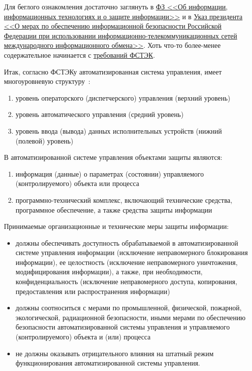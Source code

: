 Для беглого ознакомления достаточно заглянуть в
\href{http://www.consultant.ru/document/cons_doc_LAW_61798/0e9ec16b786dcbdaaa7f44abfc4a15e601d5be22/#dst100144}{ФЗ <<Об информации, информационных технологиях и о защите информации>>} и в \href{http://www.consultant.ru/document/cons_doc_LAW_75586/#dst0}{Указ президента <<О мерах по обеспечению информационной безопасности Российской Федерации при использовании информационно-телекоммуникационных сетей международного информационного обмена>>}. Хоть что-то более-менее содержательное начинается с \href{https://fstec.ru/en/288-tekhnicheskaya-zashchita-informatsii/obespechenie-bezopasnosti-kriticheskoj-informatsionnoj-infrastruktury/prikazy/1702-prikaz-fstek-rossii-ot-14-marta-2014-g-n-32}{требований ФСТЭК}.

Итак, согласно ФСТЭКу автоматизированная система управления, имеет многоуровневую структуру~\label{pon:bez}:
\begin{enumerate}
	\item уровень операторского (диспетчерского) управления (верхний уровень)
	\item уровень автоматического управления (средний уровень)
	\item уровень ввода (вывода) данных исполнительных устройств (нижний (полевой) уровень)
\end{enumerate}

В автоматизированной системе управления объектами защиты являются:
\begin{enumerate}
	\item информация (данные) о параметрах (состоянии) управляемого (контролируемого) объекта или процесса
	\item программно-технический комплекс, включающий технические средства, программное обеспечение, а также средства защиты информации
\end{enumerate}
\begin{grayquote}
	Принимаемые организационные и технические меры защиты информации:
	\begin{itemize}
		\item должны обеспечивать доступность обрабатываемой в автоматизированной системе управления информации (исключение неправомерного блокирования информации), ее целостность (исключение неправомерного уничтожения, модифицирования информации), а также, при необходимости, конфиденциальность (исключение неправомерного доступа, копирования, предоставления или распространения информации)

		\item должны соотноситься с мерами по промышленной, физической, пожарной, экологической, радиационной безопасности, иными мерами по обеспечению безопасности автоматизированной системы управления и управляемого (контролируемого) объекта и (или) процесса

		\item не должны оказывать отрицательного влияния на штатный режим функционирования автоматизированной системы управления.
	\end{itemize}
\end{grayquote}

